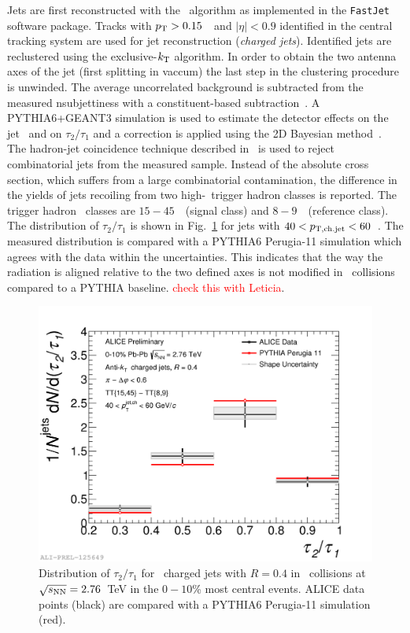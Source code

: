 \documentclass[10pt]{article}
\begin{document}
Jets are first reconstructed with the \antikt\ algorithm as implemented in the \texttt{FastJet}\cite{Cacciari:2012a} software package.
Tracks with $p_{\rm T}>0.15$~\GeVc\ and $|\eta|<0.9$ identified in the central tracking system
are used for jet reconstruction (\emph{charged jets}). 
Identified jets are reclustered using the exclusive-$k_{\rm T}$ algorithm. In order to obtain the two antenna axes of the jet (first splitting in vaccum) 
the last step in the clustering procedure is unwinded.
The average uncorrelated background is subtracted from the measured nsubjettiness with a constituent-based subtraction~\cite{Berta:2014}.
A PYTHIA6+GEANT3 simulation is used to estimate the detector effects on the jet \pt\ and on $\tau_2/\tau_1$ and a correction is applied using the 2D Bayesian method~\cite{Dagostini:1995}.
The hadron-jet coincidence technique described in~\cite{ALICE:2015g} is used to reject combinatorial jets from the measured sample. 
Instead of the absolute cross section, which suffers from a large combinatorial contamination, the difference in the yields of jets recoiling from two high-\pt\ trigger hadron classes is reported. 
The trigger hadron \pt\ classes are $15-45$~\GeVc\ (signal class) and $8-9$~\GeVc\ (reference class). The distribution of $\tau_2/\tau_1$ is shown in Fig.~\ref{fig:nsubjettiness} for jets with $40<p_{\rm T,ch.jet}<60$~\GeVc.
The measured distribution is compared with a PYTHIA6 Perugia-11 simulation which agrees with the data within the uncertainties. 
This indicates that the way the radiation is aligned relative to the two defined axes is not modified in \PbPb\ collisions compared to a PYTHIA baseline. \textcolor{red}{check this with Leticia}.
\begin{figure}[tb]
\centering
\includegraphics[width=.5\textwidth]{img/2017-Feb-03-Tau2to1_40to60_Full_Results_0}
\caption{Distribution of $\tau_2/\tau_1$ for \antikt\ charged jets with $R=0.4$ in \PbPb\ collisions at $\sqrt{s_{\rm NN}}=2.76$~TeV in the $0-10$\% most central events. 
ALICE data points (black) are compared with a PYTHIA6 Perugia-11 simulation (red).}
\label{fig:nsubjettiness}
\end{figure}
\end{document}
